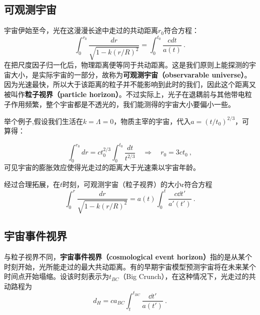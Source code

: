 


\subsection{可观测宇宙}
宇宙伊始至今，光在这漫漫长途中走过的共动距离$r_0$符合方程：
\begin{equation}
\int_{0}^{r_{0}} \frac{d r}{\sqrt{1-k (r/R)^{2}}}=\int_{0}^{t_{0}} \frac{c d t}{a(t)}~.
\end{equation}
在把尺度因子归一化后，物理距离便等同于共动距离。这是我们原则上能探测的宇宙大小，是实际宇宙的一部分，故称为\textbf{可观测宇宙（observarable universe）}。因为光速最快，所以大于该距离的粒子并不能影响到此时的我们，因此这个距离又被叫作\textbf{粒子视界（particle horizon）}。不过实际上，光子在退耦前与其他带电粒子作用频繁，整个宇宙都是不透光的，我们能测得的宇宙大小要偏小一些。

举个例子,假设我们生活在$k=\Lambda=0$，物质主宰的宇宙，代入$a=(t/t_0)^{2/3}$，可算得：

\begin{equation}\int_0^{r_0}dr=ct_0^{2/3}\int_0^{t_0}\frac{dt}{t^{2/3}}\quad\Longrightarrow\quad r_0=3ct_0 ~,\end{equation}
可见宇宙的膨胀效应使得光走过的距离大于光速乘以宇宙年龄。

经过合理拓展，在$t$时刻，可观测宇宙（粒子视界）的大小r符合方程
\begin{equation}
\int_{0}^{r} \frac{d r}{\sqrt{1-k (r/R)^{2}}}=a(t)\int_{0}^{t} \frac{c \dd t'}{a'(t')}~.
\end{equation}

\subsection{宇宙事件视界}
与粒子视界不同，\textbf{宇宙事件视界（cosmological event horizon）}指的是从某个时刻开始，光所能走过的最大共动距离。有的早期宇宙模型预测宇宙将在未来某个时间点开始塌缩。设该时刻表示为$t_{BC}$（Big Crunch），在这种情况下，光走过的共动路程为
\begin{equation}
d_H=ca_{BC}\int^{t_{BC}}_{t}\frac{\dd t'}{a(t')}~.
\end{equation}